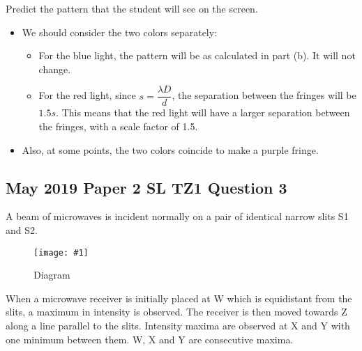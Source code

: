 \documentclass[a4paper,12pt]{article}
\newcommand{\img}[4]{\begin{center}
  \begin{figure}[H]
    \centering
    \texttt{[image: \#1]}
    \caption{#3}
    \label{fig:#4}
  \end{figure}
\end{center}}
\begin{document}
\begin{enumerate}[label=(\alph*)]
\begin{itemize}
        \end{itemize}
        Predict the pattern that the student will see on the screen.
        \begin{itemize}
          \item We should consider the two colors separately:
                \begin{itemize}
                  \item For the blue light, the pattern will be as calculated in part (b). It will not change.
                  \item For the red light, since $s = \dfrac{\lambda D}{d}$, the separation between the fringes will be $1.5s$. This means that the red light will have a larger separation between the fringes, with a scale factor of 1.5.
                \end{itemize}
          \item Also, at some points, the two colors coincide to make a purple fringe.
        \end{itemize}
\end{enumerate}

\pagebreak

\subsection{May 2019 Paper 2 SL TZ1 Question 3}

A beam of microwaves is incident normally on a pair of identical narrow slits S1 and S2.

\img{ex/4.png}{0.7}{Diagram}{ex4}

When a microwave receiver is initially placed at W which is equidistant from the slits, a
maximum in intensity is observed. The receiver is then moved towards Z along a line parallel
to the slits. Intensity maxima are observed at X and Y with one minimum between them. W, X
and Y are consecutive maxima.
\end{document}
